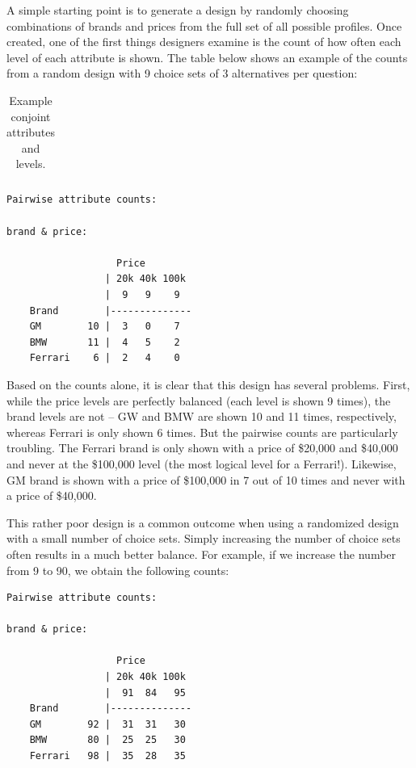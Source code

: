 \documentclass[
  12pt,
]{article}
\begin{document}
A simple starting point is to generate a design by randomly choosing
combinations of brands and prices from the full set of all possible
profiles. Once created, one of the first things designers examine is the
count of how often each level of each attribute is shown. The table
below shows an example of the counts from a random design with 9 choice
sets of 3 alternatives per question:

\begin{table}

\caption{\label{tab:unnamed-chunk-2}Example conjoint attributes and levels.}
\centering
\begin{tabular}[t]{}
\toprule

\bottomrule
\end{tabular}
\end{table}

\begin{verbatim}
Pairwise attribute counts:

brand & price:

                   Price
                 | 20k 40k 100k
                 |  9   9    9
    Brand        |--------------
    GM        10 |  3   0    7
    BMW       11 |  4   5    2
    Ferrari    6 |  2   4    0
\end{verbatim}

Based on the counts alone, it is clear that this design has several
problems. First, while the price levels are perfectly balanced (each
level is shown 9 times), the brand levels are not -- GW and BMW are
shown 10 and 11 times, respectively, whereas Ferrari is only shown 6
times. But the pairwise counts are particularly troubling. The Ferrari
brand is only shown with a price of \$20,000 and \$40,000 and never at
the \$100,000 level (the most logical level for a Ferrari!). Likewise,
GM brand is shown with a price of \$100,000 in 7 out of 10 times and
never with a price of \$40,000.

This rather poor design is a common outcome when using a randomized
design with a small number of choice sets. Simply increasing the number
of choice sets often results in a much better balance. For example, if
we increase the number from 9 to 90, we obtain the following counts:

\begin{verbatim}
Pairwise attribute counts:

brand & price:

                   Price
                 | 20k 40k 100k
                 |  91  84   95
    Brand        |--------------
    GM        92 |  31  31   30
    BMW       80 |  25  25   30
    Ferrari   98 |  35  28   35
\end{verbatim}
\end{document}
